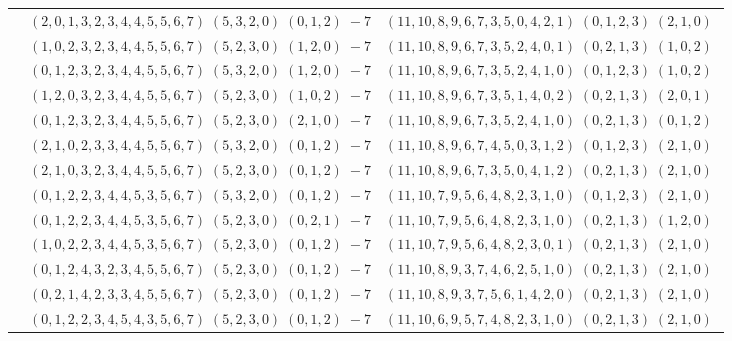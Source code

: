 \documentclass[11pt]{article}
\begin{document}
\begin{longtable}[l]{|c|c|c|}
 \cline{2-3} 
 & $(2 ,0 ,1 ,3 ,2 ,3 ,4 ,4 ,5 ,5 ,6 ,7) \;(5 ,3 ,2 ,0) \;(0 ,1 ,2) \;-7$ & $(11 ,10 ,8 ,9 ,6 ,7 ,3 ,5 ,0 ,4 ,2 ,1) \;(0 ,1 ,2 ,3) \;(2 ,1 ,0) \;$\\ 
 \cline{2-3} 
 & $(1 ,0 ,2 ,3 ,2 ,3 ,4 ,4 ,5 ,5 ,6 ,7) \;(5 ,2 ,3 ,0) \;(1 ,2 ,0) \;-7$ & $(11 ,10 ,8 ,9 ,6 ,7 ,3 ,5 ,2 ,4 ,0 ,1) \;(0 ,2 ,1 ,3) \;(1 ,0 ,2) \;$\\ 
 \cline{2-3} 
 & $(0 ,1 ,2 ,3 ,2 ,3 ,4 ,4 ,5 ,5 ,6 ,7) \;(5 ,3 ,2 ,0) \;(1 ,2 ,0) \;-7$ & $(11 ,10 ,8 ,9 ,6 ,7 ,3 ,5 ,2 ,4 ,1 ,0) \;(0 ,1 ,2 ,3) \;(1 ,0 ,2) \;$\\ 
 \cline{2-3} 
 & $(1 ,2 ,0 ,3 ,2 ,3 ,4 ,4 ,5 ,5 ,6 ,7) \;(5 ,2 ,3 ,0) \;(1 ,0 ,2) \;-7$ & $(11 ,10 ,8 ,9 ,6 ,7 ,3 ,5 ,1 ,4 ,0 ,2) \;(0 ,2 ,1 ,3) \;(2 ,0 ,1) \;$\\ 
 \cline{2-3} 
 & $(0 ,1 ,2 ,3 ,2 ,3 ,4 ,4 ,5 ,5 ,6 ,7) \;(5 ,2 ,3 ,0) \;(2 ,1 ,0) \;-7$ & $(11 ,10 ,8 ,9 ,6 ,7 ,3 ,5 ,2 ,4 ,1 ,0) \;(0 ,2 ,1 ,3) \;(0 ,1 ,2) \;$\\ 
 \cline{2-3} 
 & $(2 ,1 ,0 ,2 ,3 ,3 ,4 ,4 ,5 ,5 ,6 ,7) \;(5 ,3 ,2 ,0) \;(0 ,1 ,2) \;-7$ & $(11 ,10 ,8 ,9 ,6 ,7 ,4 ,5 ,0 ,3 ,1 ,2) \;(0 ,1 ,2 ,3) \;(2 ,1 ,0) \;$\\ 
 \cline{2-3} 
 & $(2 ,1 ,0 ,3 ,2 ,3 ,4 ,4 ,5 ,5 ,6 ,7) \;(5 ,2 ,3 ,0) \;(0 ,1 ,2) \;-7$ & $(11 ,10 ,8 ,9 ,6 ,7 ,3 ,5 ,0 ,4 ,1 ,2) \;(0 ,2 ,1 ,3) \;(2 ,1 ,0) \;$\\ 
 \cline{2-3} 
 & $(0 ,1 ,2 ,2 ,3 ,4 ,4 ,5 ,3 ,5 ,6 ,7) \;(5 ,3 ,2 ,0) \;(0 ,1 ,2) \;-7$ & $(11 ,10 ,7 ,9 ,5 ,6 ,4 ,8 ,2 ,3 ,1 ,0) \;(0 ,1 ,2 ,3) \;(2 ,1 ,0) \;$\\ 
 \cline{2-3} 
 & $(0 ,1 ,2 ,2 ,3 ,4 ,4 ,5 ,3 ,5 ,6 ,7) \;(5 ,2 ,3 ,0) \;(0 ,2 ,1) \;-7$ & $(11 ,10 ,7 ,9 ,5 ,6 ,4 ,8 ,2 ,3 ,1 ,0) \;(0 ,2 ,1 ,3) \;(1 ,2 ,0) \;$\\ 
 \cline{2-3} 
 & $(1 ,0 ,2 ,2 ,3 ,4 ,4 ,5 ,3 ,5 ,6 ,7) \;(5 ,2 ,3 ,0) \;(0 ,1 ,2) \;-7$ & $(11 ,10 ,7 ,9 ,5 ,6 ,4 ,8 ,2 ,3 ,0 ,1) \;(0 ,2 ,1 ,3) \;(2 ,1 ,0) \;$\\ 
 \cline{2-3} 
 & $(0 ,1 ,2 ,4 ,3 ,2 ,3 ,4 ,5 ,5 ,6 ,7) \;(5 ,2 ,3 ,0) \;(0 ,1 ,2) \;-7$ & $(11 ,10 ,8 ,9 ,3 ,7 ,4 ,6 ,2 ,5 ,1 ,0) \;(0 ,2 ,1 ,3) \;(2 ,1 ,0) \;$\\ 
 \cline{2-3} 
 & $(0 ,2 ,1 ,4 ,2 ,3 ,3 ,4 ,5 ,5 ,6 ,7) \;(5 ,2 ,3 ,0) \;(0 ,1 ,2) \;-7$ & $(11 ,10 ,8 ,9 ,3 ,7 ,5 ,6 ,1 ,4 ,2 ,0) \;(0 ,2 ,1 ,3) \;(2 ,1 ,0) \;$\\ 
 \cline{2-3} 
 & $(0 ,1 ,2 ,2 ,3 ,4 ,5 ,4 ,3 ,5 ,6 ,7) \;(5 ,2 ,3 ,0) \;(0 ,1 ,2) \;-7$ & $(11 ,10 ,6 ,9 ,5 ,7 ,4 ,8 ,2 ,3 ,1 ,0) \;(0 ,2 ,1 ,3) \;(2 ,1 ,0) \;$\\ 

\end{longtable}
\end{document}
